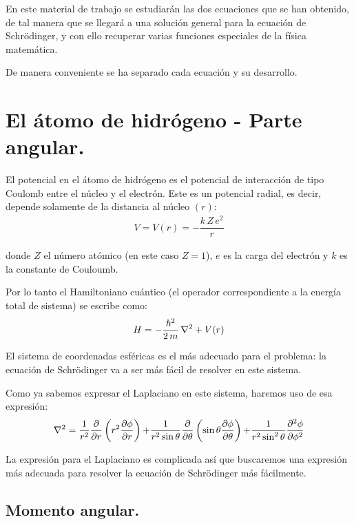 En este material de trabajo se estudiarán las dos ecuaciones que se han obtenido, de tal manera que se llegará a una solución general para la ecuación de Schrödinger, y con ello recuperar varias funciones especiales de la física matemática.
\par
De manera conveniente se ha separado cada ecuación y su desarrollo.

\section{El átomo de hidrógeno - Parte angular.}

El potencial en el átomo de hidrógeno es el potencial de interacción de tipo Coulomb entre el núcleo y el electrón. Este es un potencial radial, es decir, depende solamente de la distancia al núcleo $(r)$:
\begin{align}
V = V(r) = - \dfrac{k \, Z \, e^{2}}{r}
\label{eq:ecuacion_01}
\end{align}

donde $Z$ el número atómico (en este caso $Z=1$), $e$ es la carga del electrón y $k$ es la constante de Couloumb.
\par 
Por lo tanto el Hamiltoniano cuántico (el operador correspondiente a la energía total de sistema) se escribe como:
\begin{align}
H = - \dfrac{\hbar^{2}}{2 \, m} \, \laplacian + V(r)
\label{eq:ecuacion_02} 
\end{align}

El sistema de coordenadas esféricas es el más adecuado para el problema: la ecuación de Schrödinger va a ser más fácil de resolver en este sistema.
\par
Como ya sabemos expresar el Laplaciano en este sistema, haremos uso de esa expresión:
\begin{align*}
\laplacian = \dfrac{1}{r^{2}} \pdv{r} \left( r^{2} \pdv{\phi}{r} \right) {+} \dfrac{1}{r^{2} \sin \theta} \pdv{\theta} \left( \sin \theta \pdv{\phi}{\theta} \right) {+} \dfrac{1}{r^{2} \sin^{2} \theta} \pdv[2]{\phi}{\phi} 
\end{align*}

La expresión para el Laplaciano es complicada así que buscaremos una expresión más adecuada para resolver la ecuación de Schrödinger más fácilmente.

\subsection{Momento angular.}

